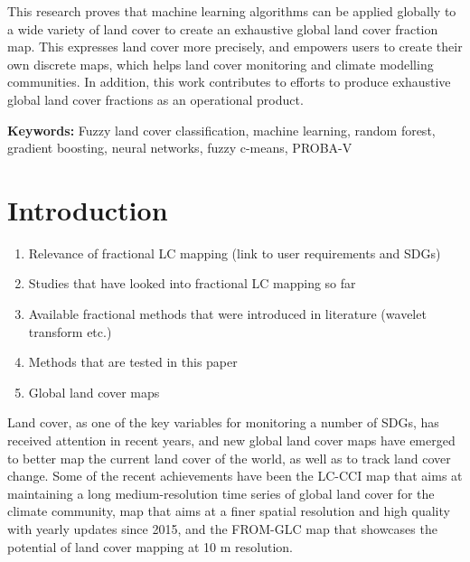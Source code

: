 \documentclass[a4paper,10pt]{article}
\newcommand{\minisection}[1]{\medskip \textbf{#1:}}
\begin{document}
{This research proves that machine learning algorithms can be applied globally to a wide variety of land cover to create an exhaustive global land cover fraction map. This expresses land cover more precisely, and empowers users to create their own discrete maps, which helps land cover monitoring and climate modelling communities. In addition, this work contributes to efforts to produce exhaustive global land cover fractions as an operational product.

\minisection{Keywords} Fuzzy land cover classification, machine learning, random forest, gradient boosting, neural networks, fuzzy c-means, PROBA-V
}

\pagebreak
\tableofcontents
\pagebreak

\section{Introduction}

\begin{enumerate}
 \item Relevance of fractional LC mapping (link to user requirements and SDGs)
 \item Studies that have looked into fractional LC mapping so far
 \item Available fractional methods that were introduced in literature (wavelet transform etc.)
 \item Methods that are tested in this paper
 \item Global land cover maps
\end{enumerate}

Land cover, as one of the key variables for monitoring a number of \glspl{SDG}, has received attention in recent years, and new global land cover maps have emerged to better map the current land cover of the world, as well as to track land cover change.
Some of the recent achievements have been the \ac{LC-CCI} map  that aims at maintaining a long medium-resolution time series of global land cover for the climate community,  map that aims at a finer spatial resolution and high quality with yearly updates since 2015, and the \ac{FROM-GLC} map \citep{fromglc2019} that showcases the potential of land cover mapping at 10 m resolution.
\end{document}
